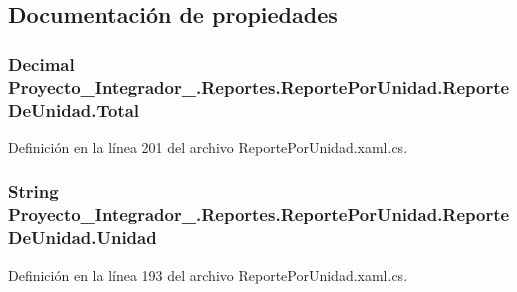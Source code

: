 \subsection{Documentación de propiedades}
\hypertarget{class_proyecto___integrador__3_1_1_reportes_1_1_reporte_por_unidad_1_1_reporte_de_unidad_aa8bef252a8dd45d28c2ee1b24f6a1a69}{
\subsubsection[{Total}]{\setlength{\rightskip}{0pt plus 5cm}Decimal Proyecto\-\_\-\-Integrador\-\_.\-Reportes.\-Reporte\-Por\-Unidad.\-Reporte\-De\-Unidad.\-Total\hspace{0.3cm}{\ttfamily [get]}}}\label{class_proyecto___integrador__3_1_1_reportes_1_1_reporte_por_unidad_1_1_reporte_de_unidad_aa8bef252a8dd45d28c2ee1b24f6a1a69}


Definición en la línea 201 del archivo Reporte\-Por\-Unidad.\-xaml.\-cs.

\hypertarget{class_proyecto___integrador__3_1_1_reportes_1_1_reporte_por_unidad_1_1_reporte_de_unidad_a70b93e2ee97c9a831953b5060debc1f1}{
\subsubsection[{Unidad}]{\setlength{\rightskip}{0pt plus 5cm}String Proyecto\-\_\-\-Integrador\-\_.\-Reportes.\-Reporte\-Por\-Unidad.\-Reporte\-De\-Unidad.\-Unidad\hspace{0.3cm}{\ttfamily [get]}}}\label{class_proyecto___integrador__3_1_1_reportes_1_1_reporte_por_unidad_1_1_reporte_de_unidad_a70b93e2ee97c9a831953b5060debc1f1}


Definición en la línea 193 del archivo Reporte\-Por\-Unidad.\-xaml.\-cs.

